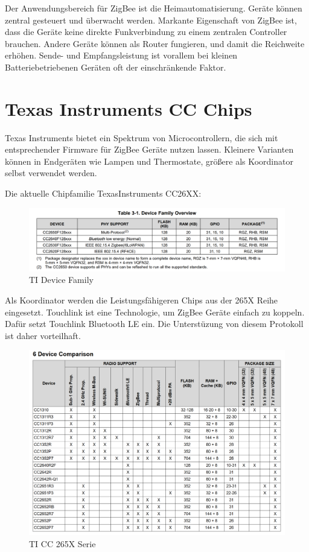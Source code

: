 Der Anwendungsbereich für ZigBee ist die Heimautomatisierung. Geräte können zentral gesteuert und überwacht werden. 
Markante Eigenschaft von ZigBee ist, dass die Geräte keine direkte Funkverbindung
zu einem zentralen Controller brauchen. Andere Geräte können als Router fungieren, und damit die Reichweite erhöhen. Sende- und Empfangsleistung
ist vorallem bei kleinen Batteriebetriebenen Geräten oft der einschränkende Faktor.



\section{Texas Instruments CC Chips}

Texas Instruments bietet ein Spektrum von Microcontrollern, die sich mit entsprechender Firmware für ZigBee Geräte 
nutzen lassen. Kleinere Varianten können in Endgeräten wie Lampen und Thermostate, größere als Koordinator selbst verwendet werden.

Die aktuelle Chipfamilie TexasInstruments CC26XX:

\begin{figure}[H]
  \centering
  \includegraphics[width=1\textwidth]{media/table26xx.png}
  \caption{TI Device Family}
\end{figure}

Als Koordinator werden die Leistungsfähigeren Chips aus der 265X Reihe eingesetzt. Touchlink ist eine Technologie, um ZigBee Geräte einfach zu koppeln. Dafür setzt
Touchlink Bluetooth LE ein. Die Unterstüzung von diesem Protokoll ist daher vorteilhaft.

\begin{figure}[H]
  \centering
  \includegraphics[width=1\textwidth]{media/table265x.png}
  \caption{TI CC 265X Serie}
\end{figure}

